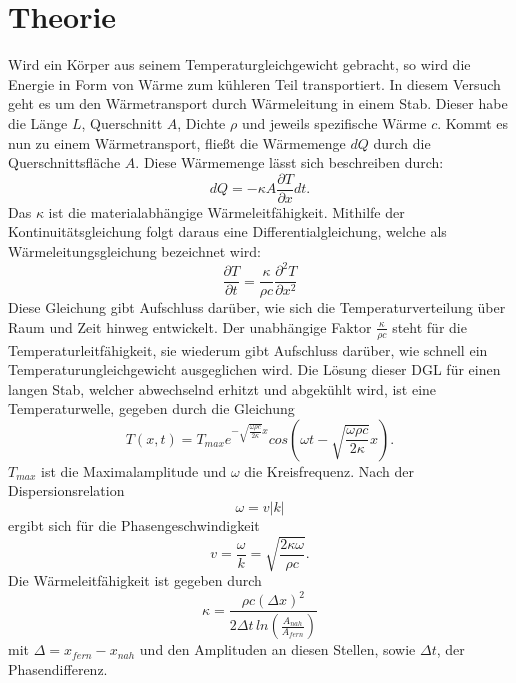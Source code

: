 \section{Theorie}
\label{sec:Theorie}

Wird ein Körper aus seinem Temperaturgleichgewicht gebracht, so wird die Energie 
in Form von Wärme zum kühleren Teil transportiert. In diesem Versuch geht es 
um den Wärmetransport durch Wärmeleitung in einem Stab. Dieser habe die Länge 
$L$, Querschnitt $A$, Dichte $\rho$ und jeweils spezifische Wärme $c$. Kommt 
es nun zu einem Wärmetransport, fließt die Wärmemenge $dQ$ durch die Querschnittsfläche
$A$. Diese Wärmemenge lässt sich beschreiben durch:
\begin{equation}
    \label{eqn:1}
    dQ = - \kappa A \frac{\partial T}{\partial x} dt.
\end{equation}
Das $\kappa$ ist die materialabhängige Wärmeleitfähigkeit. Mithilfe der 
Kontinuitätsgleichung folgt daraus eine Differentialgleichung, welche als 
Wärmeleitungsgleichung bezeichnet wird:
\begin{equation}
    \label{eqn:2}
    \frac{\partial T}{\partial t} = \frac{\kappa}{\rho c} \frac{\partial ^2 T}{\partial x^2}
\end{equation}
Diese Gleichung gibt Aufschluss darüber, wie sich die Temperaturverteilung 
über Raum und Zeit hinweg entwickelt. Der unabhängige Faktor $\frac{\kappa}{\rho c}$
steht für die Temperaturleitfähigkeit, sie wiederum gibt Aufschluss darüber, 
wie schnell ein Temperaturungleichgewicht ausgeglichen wird. Die Lösung dieser 
DGL für einen langen Stab, welcher abwechselnd erhitzt und abgekühlt wird, ist 
eine Temperaturwelle, gegeben durch die Gleichung 
\begin{equation}
    \label{eqn:3}
    T(x,t)=T_{max}e^{-\sqrt{\frac{\omega \rho c}{2\kappa}}x}cos(\omega t - \sqrt{\frac{\omega \rho c}{2\kappa}}x).
\end{equation}
$T_{max}$ ist die Maximalamplitude und $\omega$ die Kreisfrequenz. Nach der 
Dispersionsrelation
\begin{equation}
    \label{eqn:4}
    \omega = v |k|
\end{equation}
ergibt sich für die Phasengeschwindigkeit
\begin{equation}
    \label{eqn:5}
    v = \frac{\omega}{k} = \sqrt{\frac{2\kappa \omega}{\rho c}}.
\end{equation}
Die Wärmeleitfähigkeit ist gegeben durch 
\begin{equation}
    \label{eqn:6}
    \kappa = \frac{\rho c(\Delta x)^2}{2 \Delta t \, ln(\frac{A_{nah}}{A_{fern}})}
\end{equation}
mit $\Delta = x_{fern} - x_{nah}$ und den Amplituden an diesen Stellen, sowie 
$\Delta t$, der Phasendifferenz.

